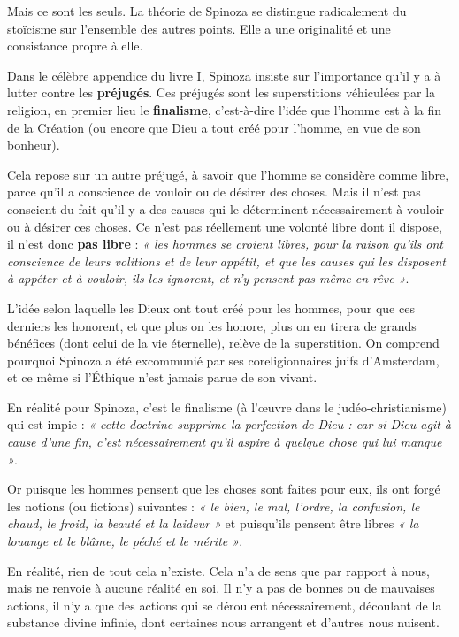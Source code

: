 Mais ce sont les seuls. La théorie de Spinoza se distingue radicalement du
stoïcisme sur l’ensemble des autres points. Elle a une originalité et une
consistance propre à elle.

\vspace{0.5cm}
Dans le célèbre appendice du livre I, Spinoza insiste sur l’importance qu’il y
a à lutter contre les {\bf préjugés}. Ces préjugés sont les superstitions véhiculées
par la religion, en premier lieu le {\bf finalisme}, c’est-à-dire l’idée que l’homme
est à la fin de la Création (ou encore que Dieu a tout créé pour l’homme, en
vue de son bonheur).

Cela repose sur un autre préjugé, à savoir que l’homme se considère comme
libre, parce qu’il a conscience de vouloir ou de désirer des choses. Mais
il n’est pas conscient du fait qu’il y a des causes qui le déterminent
nécessairement à vouloir ou à désirer ces choses. Ce n’est pas réellement une
volonté libre dont il dispose, il n’est donc {\bf pas libre} : {\it « les hommes se croient
libres, pour la raison qu’ils ont conscience de leurs volitions et de leur
appétit, et que les causes qui les disposent à appéter et à vouloir, ils les
ignorent, et n’y pensent pas même en rêve »}.

L’idée selon laquelle les Dieux ont tout créé pour les hommes, pour que ces
derniers les honorent, et que plus on les honore, plus on en tirera de grands
bénéfices (dont celui de la vie éternelle), relève de la superstition. On
comprend pourquoi Spinoza a été excommunié par ses coreligionnaires juifs
d’Amsterdam, et ce même si l’Éthique n’est jamais parue de son vivant.

\vspace{0.5cm}
En réalité pour Spinoza, c’est le finalisme (à l’œuvre dans le
judéo-christianisme) qui est impie : {\it « cette doctrine supprime la perfection
de Dieu : car si Dieu agit à cause d’une fin, c’est nécessairement qu’il aspire
à quelque chose qui lui manque »}.

Or puisque les hommes pensent que les choses sont faites pour eux, ils ont
forgé les notions (ou fictions) suivantes : {\it « le bien, le mal, l’ordre, la
confusion, le chaud, le froid, la beauté et la laideur »} et puisqu’ils pensent
être libres {\it « la louange et le blâme, le péché et le mérite »}.

En réalité, rien de tout cela n’existe. Cela n’a de sens que par rapport à
nous, mais ne renvoie à aucune réalité en soi. Il n’y a pas de bonnes ou de
mauvaises actions, il n’y a que des actions qui se déroulent nécessairement,
découlant de la substance divine infinie, dont certaines nous arrangent et
d’autres nous nuisent.

